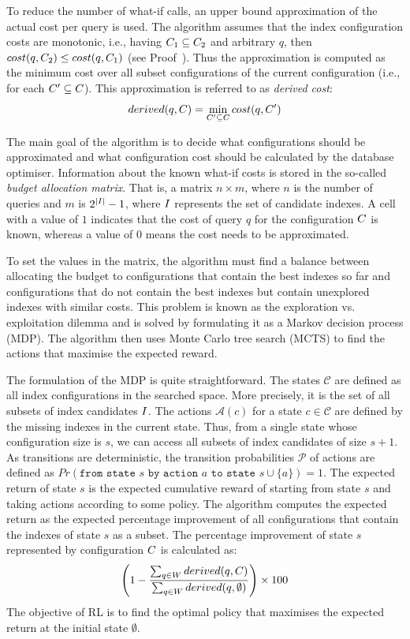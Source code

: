 To reduce the number of what-if calls, an upper bound approximation of the actual cost per query is used. The algorithm assumes that the index configuration costs are monotonic, i.e., having $C_1 \subseteq C_2$ and arbitrary $q$, then $cost(q,C_2) \le cost(q,C_1)$ (see Proof~\citep{MCTS}). Thus the approximation is computed as the minimum cost over all subset configurations of the current configuration (i.e., for each $C' \subseteq C$). This approximation is referred to as \textit{derived cost}:
$$
derived(q, C) = \min_{C' \subseteq C} cost(q, C')
$$

The main goal of the algorithm is to decide what configurations should be approximated and what configuration cost should be calculated by the database optimiser. Information about the known what-if costs is stored in the so-called \textit{budget allocation matrix}. That is, a matrix $n \times m$, where $n$ is the number of queries and $m$ is $2^{|I|}-1$, where $I$ represents the set of candidate indexes. A cell with a value of $1$ indicates that the cost of query $q$ for the configuration $C$ is known, whereas a value of $0$ means the cost needs to be approximated.

To set the values in the matrix, the algorithm must find a balance between allocating the budget to configurations that contain the best indexes so far and configurations that do not contain the best indexes but contain unexplored indexes with similar costs. This problem is known as the exploration vs. exploitation dilemma and is solved by formulating it as a Markov decision process (MDP). The algorithm then uses Monte Carlo tree search (MCTS) to find the actions that maximise the expected reward.

The formulation of the MDP is quite straightforward. The states $\mathcal{C}$ are defined as all index configurations in the searched space. More precisely, it is the set of all subsets of index candidates $I$. The actions $\mathcal{A}(c)$ for a state $c \in \mathcal{C}$ are defined by the missing indexes in the current state. Thus, from a single state whose configuration size is $s$, we can access all subsets of index candidates of size $s+1$. As transitions are deterministic, the transition probabilities $\mathcal{P}$ of actions are defined as $Pr(\texttt{from state } s \texttt{ by action } a \texttt{ to state } s \cup \{a\}) = 1 $. The expected return of state $s$ is the expected cumulative reward of starting from state $s$ and taking actions according to some policy. The algorithm computes the expected return as the expected percentage improvement of all configurations that contain the indexes of state $s$ as a subset. The percentage improvement of state $s$ represented by configuration $C$ is calculated as:
$$
{\left(1- \frac{\sum_{q \in W} derived(q,C)}{\sum_{q \in W} derived(q,\emptyset)}\right)} \times 100
$$
The objective of RL is to find the optimal policy that maximises the expected return at the initial state $\emptyset$.

